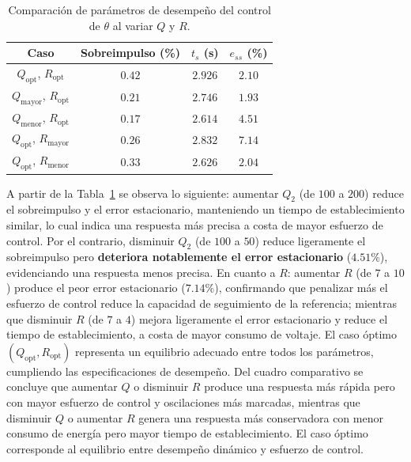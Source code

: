 \begin{table}[H]
\centering
\caption{Comparación de parámetros de desempeño del control de $\theta$ al variar $Q$ y $R$.}
\label{tab:act2_comparativo}
\renewcommand{\arraystretch}{1.3}
\begin{tabular}{|c|c|c|c|}
\hline
\textbf{Caso} & \textbf{Sobreimpulso (\%)} & \textbf{$t_s$ (s)} & \textbf{$e_{ss}$ (\%)} \\\hline
$Q_{\text{opt}}$, $R_{\text{opt}}$      & $0.42$ & $2.926$ & $2.10$ \\\hline
$Q_{\text{mayor}}$, $R_{\text{opt}}$    & $0.21$ & $2.746$ & $1.93$ \\\hline
$Q_{\text{menor}}$, $R_{\text{opt}}$    & $0.17$ & $2.614$ & $4.51$ \\\hline
$Q_{\text{opt}}$, $R_{\text{mayor}}$    & $0.26$ & $2.832$ & $7.14$ \\\hline
$Q_{\text{opt}}$, $R_{\text{menor}}$    & $0.33$ & $2.626$ & $2.04$ \\\hline
\end{tabular}
\end{table}

\noindent A partir de la Tabla~\ref{tab:act2_comparativo} se observa lo siguiente: aumentar $Q_2$ (de $100$ a $200$) reduce el sobreimpulso y el error estacionario, manteniendo un tiempo de establecimiento similar, lo cual indica una respuesta más precisa a costa de mayor esfuerzo de control. Por el contrario, disminuir $Q_2$ (de $100$ a $50$) reduce ligeramente el sobreimpulso pero \textbf{deteriora notablemente el error estacionario} ($4.51\%$), evidenciando una respuesta menos precisa. En cuanto a $R$: aumentar $R$ (de $7$ a $10$) produce el peor error estacionario ($7.14\%$), confirmando que penalizar más el esfuerzo de control reduce la capacidad de seguimiento de la referencia; mientras que disminuir $R$ (de $7$ a $4$) mejora ligeramente el error estacionario y reduce el tiempo de establecimiento, a costa de mayor consumo de voltaje. El caso óptimo $(Q_{\text{opt}}, R_{\text{opt}})$ representa un equilibrio adecuado entre todos los parámetros, cumpliendo las especificaciones de desempeño.
\noindent Del cuadro comparativo se concluye que aumentar $Q$ o disminuir $R$ produce una respuesta más rápida pero con mayor esfuerzo de control y oscilaciones más marcadas, mientras que disminuir $Q$ o aumentar $R$ genera una respuesta más conservadora con menor consumo de energía pero mayor tiempo de establecimiento. El caso óptimo corresponde al equilibrio entre desempeño dinámico y esfuerzo de control.


